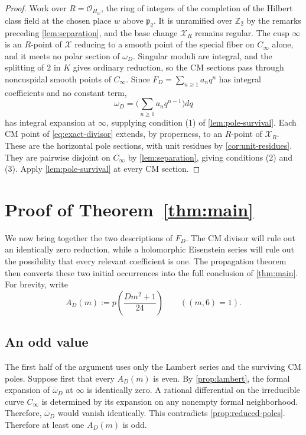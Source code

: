 \documentclass[11pt]{amsart}
\theoremstyle{remark}
\numberwithin{equation}{section}
\newcommand{\Z}{\mathbb Z}
\newcommand{\cO}{\mathcal O}
\newcommand{\cX}{\mathcal X}
\begin{document}
\begin{proof}
 Work over $R=\cO_{H_w}$, the ring of integers of the completion of the
 Hilbert class field at the chosen place $w$ above $\mathfrak p_2$.  It is
 unramified over $\Z_2$ by the remarks preceding \cref{lem:separation}, and
 the base change $\cX_R$ remains regular.
 The cusp $\infty$ is an $R$-point of $\cX$ reducing to a smooth point of
 the special fiber on $C_\infty$ alone, and it meets no polar section of
 $\omega_D$. Singular moduli are integral, and the splitting of $2$ in $K$
 gives ordinary reduction, so the CM sections pass through noncuspidal smooth
 points of $C_\infty$.
 Since $F_D=\sum_{n\geq1}a_nq^n$ has integral coefficients and no constant
 term,
 \[
  \omega_D=\biggl(\sum_{n\geq1}a_nq^{n-1}\biggr)dq
 \]
 has integral
 expansion at $\infty$, supplying condition (1) of
 \cref{lem:pole-survival}.  Each CM point of \eqref{eq:exact-divisor}
 extends, by properness, to an $R$-point of $\cX_R$. These are the
 horizontal pole sections, with unit residues by
 \cref{cor:unit-residues}.  They are pairwise
 disjoint on $C_\infty$ by \cref{lem:separation}, giving conditions (2)
 and (3).  Apply \cref{lem:pole-survival} at every CM section.
\end{proof}

\section{Proof of Theorem~\ref{thm:main}}\label{sec:main-proof}

We now bring together the two descriptions of $F_D$.  The CM divisor will
rule out an identically zero reduction, while a holomorphic Eisenstein
series will rule out the possibility that every relevant coefficient is
one.  The propagation theorem then converts these two initial occurrences
into the full conclusion of \cref{thm:main}.
For brevity, write
\[
 A_D(m):=p\!\left(\frac{Dm^2+1}{24}\right)
 \qquad ((m,6)=1).
\]

\subsection{An odd value}

The first half of the argument uses only the Lambert series and the
surviving CM poles.
Suppose first that every $A_D(m)$ is even.  By \cref{prop:lambert}, the
formal expansion of $\overline\omega_D$ at $\infty$ is identically zero.
A rational differential on the irreducible curve $C_\infty$ is determined by
its expansion on any nonempty formal neighborhood.  Therefore,
$\overline\omega_D$ would vanish identically.  This contradicts
\cref{prop:reduced-poles}.  Therefore at least one $A_D(m)$ is odd.
\end{document}
